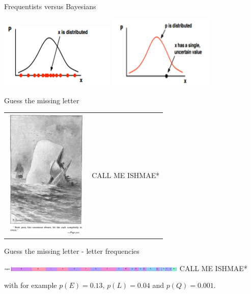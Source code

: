\documentclass{beamer}
\newcommand{\crish}{\color{reddish}}
\newcommand{\cbla}{\color{black}}
\newcommand{\cred}{\color{red}}
\newcommand{\cblu}{\color{blue}}
\begin{document}
\begin{frame}{Frequentists versus Bayesians}
  \begin{center}
\includegraphics[width=5.5cm]{fig_freq.png}
\includegraphics[width=5cm]{fig_bayes.png}
\end{center}
  \vfill
{}  
\end{frame}

\begin{frame}{Guess the missing letter}
  \begin{tabular}{lc}
    \includegraphics[width=4cm]{Moby_Dick.jpg}&\cred{}CALL ME ISHMAE*\cbla{}
  \end{tabular}
  \end{frame}


\begin{frame}{Guess the missing letter - letter frequencies}
  \begin{center}
    \includegraphics[width=9cm]{freq.png}
  \vskip 1cm
    \cred{}CALL ME ISHMAE\cblu{}*\cbla{}
  \end{center}
  with for example \crish$p(E)=0.13$\cbla{}, \crish$p(L)=0.04$\cbla{} and \crish$p(Q)=0.001$\cbla{}. 
  \vfill
  \end{frame}
\end{document}
